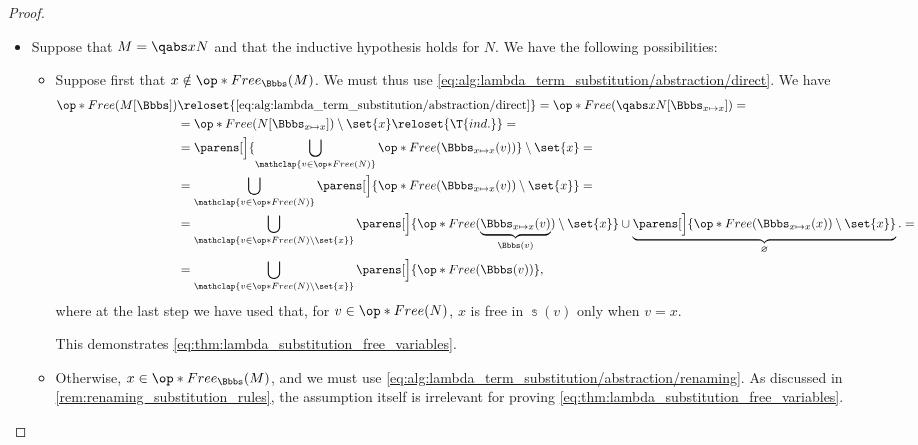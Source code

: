 \begin{proof}
\begin{itemize}
    \item Suppose that \( M = \qabs x N \) and that the inductive hypothesis holds for \( N \). We have the following possibilities:
    \begin{itemize}
      \item Suppose first that \( x \notin \op*{Free}_\Bbbs(M) \). We must thus use \eqref{eq:alg:lambda_term_substitution/abstraction/direct}. We have
      \begin{align*}
        \op*{Free}(M[\Bbbs])
        &\reloset{\eqref{eq:alg:lambda_term_substitution/abstraction/direct}} =
        \op*{Free}(\qabs x N[\Bbbs_{x \mapsto x}])
        = \\ &=
        \op*{Free}(N[\Bbbs_{x \mapsto x}]) \setminus \set{ x }
        \reloset{\T{ind.}} = \\ &=
        \parens[\Big]{ \bigcup_{\mathclap{v \in \op*{Free}(N)}} \op*{Free}(\Bbbs_{x \mapsto x}(v)) } \setminus \set{ x }
        = \\ &=
        \bigcup_{\mathclap{v \in \op*{Free}(N)}} \parens[\Big]{ \op*{Free}(\Bbbs_{x \mapsto x}(v)) \setminus \set{ x } }
        = \\ &=
        \bigcup_{\mathclap{v \in \op*{Free}(N) \setminus \set{ x }}} \parens[\Big]{ \op*{Free}(\underbrace{\Bbbs_{x \mapsto x}(v)}_{\Bbbs(v)}) \setminus \set{ x } } \cup \underbrace{\parens[\Big]{ \op*{Free}(\Bbbs_{x \mapsto x}(x)) \setminus \set{ x } }}_\varnothing.
        = \\ &=
        \bigcup_{\mathclap{v \in \op*{Free}(N) \setminus \set{ x }}} \parens[\Big]{ \op*{Free}(\Bbbs(v)) },
      \end{align*}
      where at the last step we have used that, for \( v \in \op*{Free}(N) \), \( x \) is free in \( \Bbbs(v) \) only when \( v = x \).

      This demonstrates \eqref{eq:thm:lambda_substitution_free_variables}.

      \item Otherwise, \( x \in \op*{Free}_\Bbbs(M) \), and we must use \eqref{eq:alg:lambda_term_substitution/abstraction/renaming}. As discussed in \cref{rem:renaming_substitution_rules}, the assumption itself is irrelevant for proving \eqref{eq:thm:lambda_substitution_free_variables}.


\end{itemize}
\end{itemize}
\end{proof}
